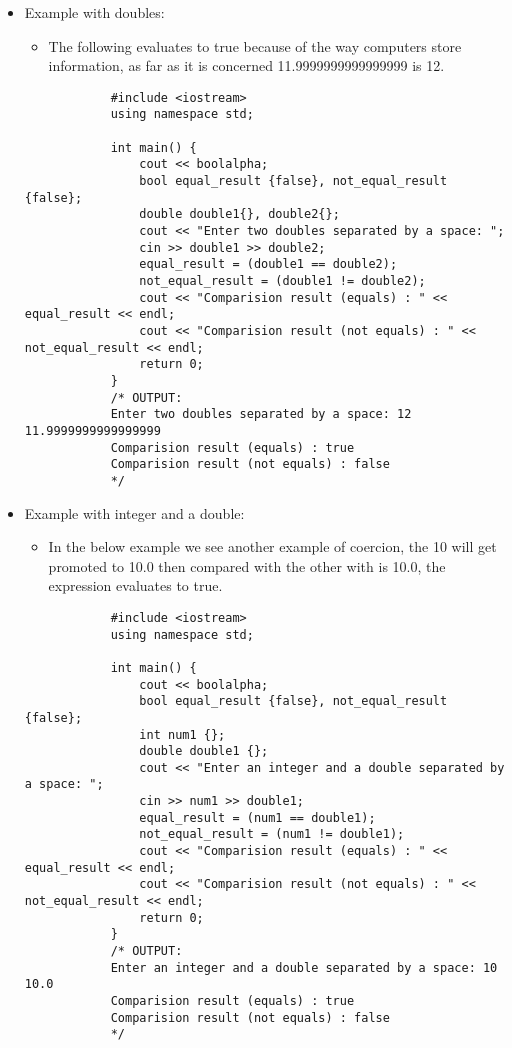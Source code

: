 \begin{itemize}
    \item Example with doubles: 
        \begin{itemize}
            \item The following evaluates to true because of the way computers store information, as far as it is concerned 11.9999999999999999 is 12.
        \end{itemize}
        \begin{verbatim}
            #include <iostream>
            using namespace std;

            int main() {
                cout << boolalpha;
                bool equal_result {false}, not_equal_result {false};
                double double1{}, double2{};
                cout << "Enter two doubles separated by a space: ";
                cin >> double1 >> double2;
                equal_result = (double1 == double2);
                not_equal_result = (double1 != double2);
                cout << "Comparision result (equals) : " << equal_result << endl;
                cout << "Comparision result (not equals) : " << not_equal_result << endl;
                return 0;
            }
            /* OUTPUT:
            Enter two doubles separated by a space: 12 11.9999999999999999
            Comparision result (equals) : true
            Comparision result (not equals) : false
            */
        \end{verbatim}
    
    \item Example with integer and a double: 
        \begin{itemize}
            \item In the below example we see another example of coercion, the 10 will get promoted to 10.0 then compared with the other with is 10.0, the expression evaluates to true.
        \end{itemize}
        \begin{verbatim}
            #include <iostream>
            using namespace std;

            int main() {
                cout << boolalpha;
                bool equal_result {false}, not_equal_result {false};
                int num1 {};
                double double1 {};
                cout << "Enter an integer and a double separated by a space: ";
                cin >> num1 >> double1;
                equal_result = (num1 == double1);
                not_equal_result = (num1 != double1);
                cout << "Comparision result (equals) : " << equal_result << endl;
                cout << "Comparision result (not equals) : " << not_equal_result << endl;
                return 0;
            }
            /* OUTPUT:
            Enter an integer and a double separated by a space: 10 10.0
            Comparision result (equals) : true
            Comparision result (not equals) : false
            */
        \end{verbatim}
\end{itemize}


